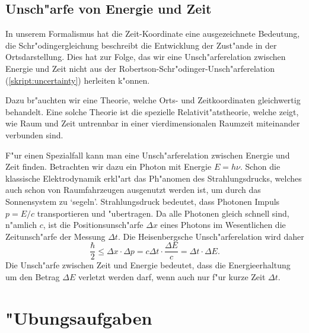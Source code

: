\subsection{Unsch"arfe von Energie und Zeit}
In unserem Formalismus hat die Zeit-Koordinate eine ausgezeichnete
Bedeutung, die Schr"odingergleichung beschreibt die Entwicklung
der Zust"ande in der Ortsdarstellung.
Dies hat zur Folge, das wir eine Unsch"arferelation zwischen Energie
und Zeit nicht aus der Robertson-Schr"odinger-Unsch"arferelation
(\ref{skript:uncertainty}) herleiten k"onnen.

Dazu br"auchten wir eine Theorie, welche Orts- und Zeitkoordinaten
gleichwertig behandelt.
Eine solche Theorie ist die spezielle Relativit"atstheorie, welche
zeigt, wie Raum und Zeit untrennbar in einer vierdimensionalen
Raumzeit miteinander verbunden sind.

F"ur einen Spezialfall kann man eine Unsch"arferelation zwischen
Energie und Zeit finden.
Betrachten wir dazu ein Photon mit Energie $E=h\nu$.
Schon die klassische Elektrodynamik erkl"art das Ph"anomen des
Strahlungsdrucks, welches auch schon von Raumfahrzeugen ausgenutzt
werden ist, um durch das Sonnensystem zu `segeln'.
Strahlungsdruck bedeutet, dass Photonen Impuls $p=E/c$ transportieren
und "ubertragen.
Da alle Photonen gleich schnell sind, n"amlich $c$, ist die
Positionsunsch"arfe $\Delta x$ eines Photons im Wesentlichen die
Zeitunsch"arfe der Messung $\Delta t$.
Die Heisenbergsche Unsch"arferelation wird daher
\[
\frac{\hbar}2\le \Delta x\cdot\Delta p=c\Delta t\cdot \frac{\Delta E}{c}=
\Delta t\cdot \Delta E.
\]
Die Unsch"arfe zwischen Zeit und Energie bedeutet, dass die
Energieerhaltung um den Betrag $\Delta E$ verletzt werden darf,
wenn auch nur f"ur kurze Zeit $\Delta t$.

\section*{"Ubungsaufgaben}
\begin{uebungsaufgaben}
\item

\item

\item

\end{uebungsaufgaben}
